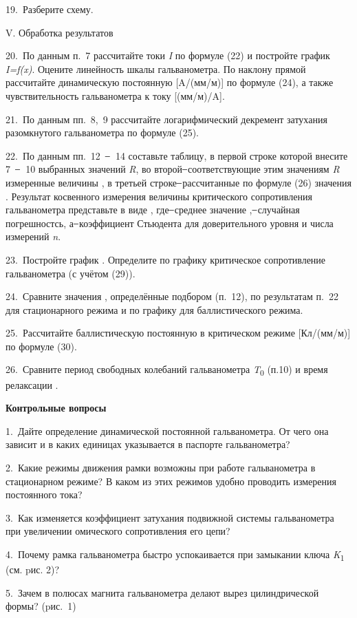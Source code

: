 \documentclass[]{article}
\begin{document}
19.~Разберите схему.

V. Обработка результатов

20.~По данным п.~7 рассчитайте токи \emph{I} по формуле (22) и постройте
график \emph{I=f(x)}. Оцените линейность шкалы гальванометра. По наклону
прямой рассчитайте динамическую постоянную {[}A/(мм/м){]} по формуле
(24), а также чувствительность гальванометра к току {[}(мм/м)/A{]}.

21.~По данным пп.~8,~9 рассчитайте логарифмический декремент затухания
разомкнутого гальванометра по формуле (25).

22.~По данным пп.~12~ ̶ ~14 составьте таблицу, в первой строке которой
внесите 7~ ̶ ~10 выбранных значений \emph{R}, во второй ̶ соответствующие
этим значениям \emph{R} измеренные величины , в третьей строке ̶
рассчитанные по формуле (26) значения . Результат косвенного измерения
величины критического сопротивления гальванометра представьте в виде ,
где ̶ среднее значение , ̶ случайная погрешностсь, а ̶ коэффициент
Стьюдента для доверительного уровня и числа измерений \emph{n}.

23.~Постройте график . Определите по графику критическое сопротивление
гальванометра (с учётом (29)).

24.~Сравните значения , определённые подбором (п.~12), по результатам
п.~22 для стационарного режима и по графику для баллистического режима.

25.~Рассчитайте баллистическую постоянную в критическом режиме
{[}Кл/(мм/м){]} по формуле (30).

26.~Сравните период свободных колебаний гальванометра
\emph{T}\textsubscript{0} (п.10) и время релаксации .

\textbf{Контрольные вопросы}

1.~Дайте определение динамической постоянной гальванометра. От чего она
зависит и в каких единицах указывается в паспорте гальванометра?

2.~Какие режимы движения рамки возможны при работе гальванометра в
стационарном режиме? В каком из этих режимов удобно проводить измерения
постоянного тока?

3.~Как изменяется коэффициент затухания подвижной системы гальванометра
при увеличении омического сопротивления его цепи?

4.~Почему рамка гальванометра быстро успокаивается при замыкании ключа
\emph{K}\textsubscript{1} (см. pис. 2)?

5.~Зачем в полюсах магнита гальванометра делают вырез цилиндрической
формы? (pис.~1)
\end{document}
